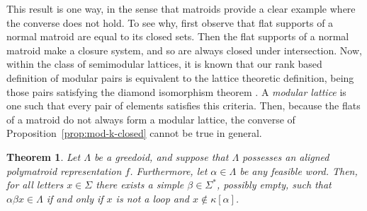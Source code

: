 \documentclass[11pt]{article}
\newtheorem{theorem}{Theorem}[section]
\newtheorem{corollary}[theorem]{Corollary}
\newcommand{\univ}{\Sigma}
\newcommand{\glang}{\Lambda}
\begin{document}
This result is one way, in the sense that matroids provide a clear example where the converse does not hold.
To see why, first observe that flat supports of a normal matroid are equal to its closed sets.
Then the flat supports of a normal matroid make a closure system, and so are always closed under intersection.
Now, within the class of semimodular lattices, it is known that our rank based definition of modular pairs is equivalent to the lattice theoretic definition, being those pairs satisfying the diamond isomorphism theorem \cite{stanley1971modular,gratzer2011lattice}.
A \emph{modular lattice} is one such that every pair of elements satisfies this criteria.
Then, because the flats of a matroid do not always form a modular lattice, the converse of Proposition~\ref{prop:mod-k-closed} cannot be true in general.

\iffalse
\begin{theorem} 
    Let $\glang$ be a greedoid, and suppose that $\glang$ possesses an aligned polymatroid representation $f$.
    Furthermore, let $\alpha \in \glang$ be any feasible word.
    Then, for all letters $x\in \univ$ there exists a simple $\beta \in \univ^*$, possibly empty, such that $\alpha \beta x \in \glang$ if and only if $x$ is not a loop and $x \notin\kappa[\alpha]$.
\end{theorem}
\end{document}
